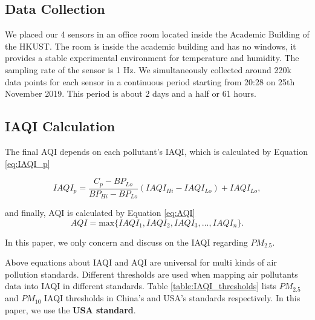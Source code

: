 \documentclass[sigconf]{acmart}
\begin{document}
\subsection{Data Collection}

We placed our 4 sensors in an office room located inside the Academic Building of the HKUST. The room is inside the academic building and has no windows, it provides a stable experimental environment for temperature and humidity. The sampling rate of the sensor is 1 Hz. We simultaneously collected around 220k data points for each sensor in a continuous period starting from 20:28 on 25th November 2019. This period is about 2 days and a half or 61 hours.

\subsection{IAQI Calculation}

The final AQI depends on each pollutant's IAQI, which is calculated by Equation \ref{eq:IAQI_p}

\begin{equation}
    \label{eq:IAQI_p}
    IAQI_p = \frac{C_p-BP_{Lo}}{BP_{Hi}-BP_{Lo}}(IAQI_{Hi}-IAQI_{Lo})+IAQI_{Lo},
\end{equation}

and finally, AQI is calculated by Equation \ref{eq:AQI}
\begin{equation}
    \label{eq:AQI}
    AQI = \text{max}\{IAQI_{1}, IAQI_{2}, IAQI_{3}, ..., IAQI_{n}\}.
\end{equation}

In this paper, we only concern and discuss on the IAQI regarding $PM_{2.5}$.



Above equations about IAQI and AQI are universal for multi kinds of air pollution standards. Different thresholds are used when mapping air pollutants data into IAQI in different standards. Table \ref{table:IAQI_thresholds} lists $PM_{2.5}$ and $PM_{10}$ IAQI thresholds in China's and USA's standards respectively. In this paper, we use the \textbf{USA standard}. 
\end{document}
